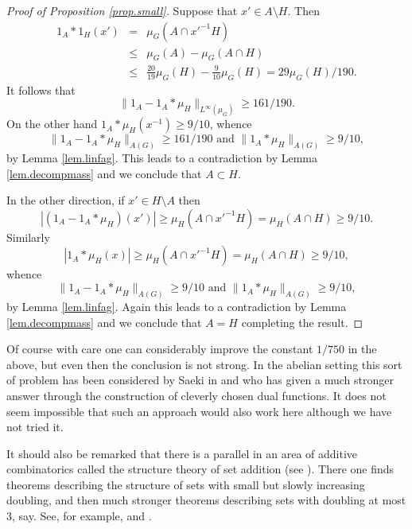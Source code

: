 \documentclass[12pt]{amsart}
\numberwithin{equation}{section}
\theoremstyle{plain}
\theoremstyle{definition}
\renewcommand{\leq}{\leqslant}
\renewcommand{\geq}{\geqslant}
\begin{document}
\begin{proof}[Proof of Proposition \ref{prop.small}]
Suppose that $x' \in A \setminus H$.  Then
\begin{eqnarray*}
1_{A} \ast 1_{H}(x')& =& \mu_G(A\cap x'^{-1}H)\\& \leq& \mu_G(A) - \mu_G(A \cap H)\\ &  \leq& \frac{20}{19}\mu_G(H) - \frac{9}{10}\mu_G(H)= 29\mu_G(H)/190.
\end{eqnarray*}
It follows that
\begin{equation*}
\|1_{A} - 1_{A} \ast \mu_{H}\|_{L^\infty(\mu_G)}\geq 161/190.
\end{equation*}
On the other hand $1_{A}\ast \mu_{H}(x^{-1}) \geq 9/10$, whence
\begin{equation*}
\|1_{A} - 1_{A} \ast \mu_{H}\|_{A(G)} \geq 161/190 \textrm{ and } \|1_{A} \ast \mu_{H}\|_{A(G)} \geq 9/10,
\end{equation*}
by Lemma \ref{lem.linfag}. This leads to a contradiction by Lemma \ref{lem.decompmass} and we conclude that $A \subset H$. 

In the other direction, if $x' \in H \setminus A$ then
\begin{equation*}
|(1_A-1_A \ast \mu_H)(x')|\geq \mu_H(A \cap x'^{-1}H)=\mu_H(A \cap H) \geq 9/10.
\end{equation*}
Similarly
\begin{equation*}
|1_A \ast \mu_H(x)| \geq \mu_H(A \cap x'^{-1}H)=\mu_H(A \cap H) \geq 9/10,
\end{equation*}
whence
\begin{equation*}
\|1_{A} - 1_{A} \ast \mu_{H}\|_{A(G)} \geq 9/10 \textrm{ and } \|1_{A} \ast \mu_{H}\|_{A(G)} \geq 9/10,
\end{equation*}
by Lemma \ref{lem.linfag}.  Again this leads to a contradiction by Lemma \ref{lem.decompmass} and we conclude that $A=H$ completing the result.
\end{proof}
Of course with care one can considerably improve the constant $1/750$ in the above, but even then the conclusion is not strong.  In the abelian setting this sort of problem has been considered by Saeki in \cite{SSI} and \cite{SSII} who has given a much stronger answer through the construction of cleverly chosen dual functions.  It does not seem impossible that such an approach would also work here although we have not tried it.

It should also be remarked that there is a parallel in an area of additive combinatorics called the structure theory of set addition (see \cite{GAF}).  There one finds theorems describing the structure of sets with small but slowly increasing doubling, and then much stronger theorems describing sets with doubling at most $3$, say.  See, for example, \cite{GAFEZ,YOHAP} and \cite{JMDGAF}.
\end{document}
